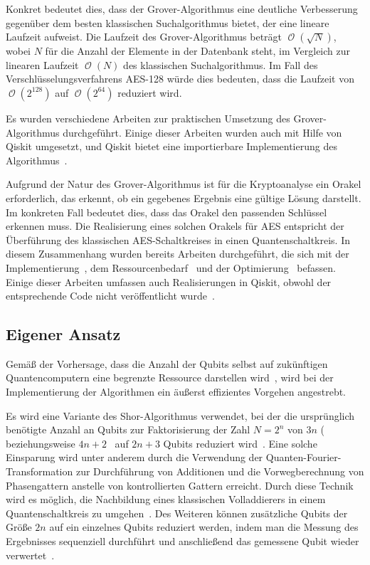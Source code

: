 \documentclass[lettersize,journal]{IEEEtran}
\DeclareMathOperator{\Landau}{\mathcal{O}} %
\begin{document}
Konkret bedeutet dies,
dass der Grover-Algorithmus eine deutliche Verbesserung gegenüber dem besten klassischen Suchalgorithmus bietet,
der eine lineare Laufzeit aufweist.
Die Laufzeit des Grover-Algorithmus beträgt \(\Landau(\sqrt N)\),
wobei \(N\) für die Anzahl der Elemente in der Datenbank steht,
im Vergleich zur linearen Laufzeit \(\Landau(N)\) des klassischen Suchalgorithmus.
Im Fall des Verschlüsselungsverfahrens AES-128 würde dies bedeuten,
dass die Laufzeit von \(\Landau(2^{128})\) auf \(\Landau(2^{64})\) reduziert wird.

Es wurden verschiedene Arbeiten zur praktischen Umsetzung des Grover-Algorithmus durchgeführt.
Einige dieser Arbeiten wurden auch mit Hilfe von Qiskit umgesetzt,
und Qiskit bietet eine importierbare Implementierung des Algorithmus~\cite{IBM:Grover}.

Aufgrund der Natur des Grover-Algorithmus ist für die Kryptoanalyse ein Orakel erforderlich,
das erkennt, ob ein gegebenes Ergebnis eine gültige Lösung darstellt.
Im konkreten Fall bedeutet dies, dass das Orakel den passenden Schlüssel erkennen muss.
Die Realisierung eines solchen Orakels für AES
entspricht der Überführung des klassischen AES-Schaltkreises in einen Quantenschaltkreis.
In diesem Zusammenhang wurden bereits Arbeiten durchgeführt,
die sich mit der Implementierung~\cite{jaques2019implementing},
dem Ressourcenbedarf~\cite{grassl2015applying} und der Optimierung~\cite{Li2022} befassen.
Einige dieser Arbeiten umfassen auch Realisierungen in Qiskit,
obwohl der entsprechende Code nicht veröffentlicht wurde~\cite{app11199085}.


\subsection{Eigener Ansatz}

Gemäß der Vorhersage, dass die Anzahl der Qubits
selbst auf zukünftigen Quantencomputern eine begrenzte Ressource darstellen wird~\cite{zalka1998fast},
wird bei der Implementierung der Algorithmen ein äußerst effizientes Vorgehen angestrebt.

Es wird eine Variante des Shor-Algorithmus verwendet,
bei der die ursprünglich benötigte Anzahl an Qubits zur Faktorisierung der Zahl
\(N = 2^{n}\) von \(3n\) (~\cite{zalka1998fast} beziehungsweise
\(4n+2\)~\cite{IBM:Shor_docu} auf \(2n+3\) Qubits reduziert wird~\cite{beauregard2003circuit}.
Eine solche Einsparung wird unter anderem durch
die Verwendung der Quanten-Fourier-Transformation zur Durchführung von Additionen und
die Vorwegberechnung von Phasengattern anstelle von kontrollierten Gattern erreicht.
Durch diese Technik wird es möglich,
die Nachbildung eines klassischen Volladdierers in einem Quantenschaltkreis zu umgehen~\cite{draper2000addition}.
Des Weiteren können zusätzliche Qubits der Größe \(2n\) auf ein einzelnes Qubits reduziert werden,
indem man die Messung des Ergebnisses sequenziell durchführt und anschließend das gemessene Qubit wieder verwertet~\cite{Parker_2000}.
\end{document}
